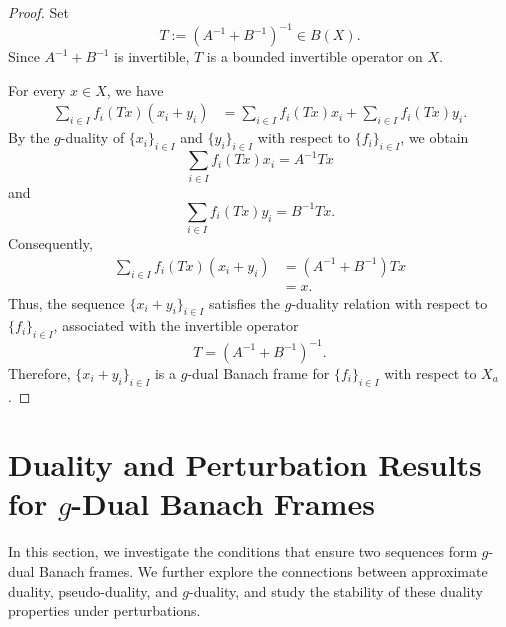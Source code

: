 \documentclass[12pt]{article}
\theoremstyle{definition}
\theoremstyle{remark}
\begin{document}
\begin{proof}
	Set
	\[
	T:=\left(A^{-1}+B^{-1}\right)^{-1}\in B(X).
	\]
	Since \(A^{-1}+B^{-1}\) is invertible, \(T\) is a bounded
	invertible operator on \(X\).
	
	For every \(x\in X\), we have
	\[
	\begin{aligned}
		\sum_{i\in I} f_i(Tx)(x_i+y_i)
		&=
		\sum_{i\in I} f_i(Tx)x_i
		+
		\sum_{i\in I} f_i(Tx)y_i.
	\end{aligned}
	\]
	By the \(g\)-duality of \(\{x_i\}_{i\in I}\) and
	\(\{y_i\}_{i\in I}\) with respect to \(\{f_i\}_{i\in I}\), we obtain
	\[
	\sum_{i\in I} f_i(Tx)x_i=A^{-1}Tx
	\]
	and
	\[
	\sum_{i\in I} f_i(Tx)y_i=B^{-1}Tx.
	\]
	Consequently,
	\[
	\begin{aligned}
		\sum_{i\in I} f_i(Tx)(x_i+y_i)
		&=(A^{-1}+B^{-1})Tx\\
		&=x.
	\end{aligned}
	\]
	Thus, the sequence \(\{x_i+y_i\}_{i\in I}\) satisfies the
	\(g\)-duality relation with respect to \(\{f_i\}_{i\in I}\),
	associated with the invertible operator
	\[
	T=\left(A^{-1}+B^{-1}\right)^{-1}.
	\]
	Therefore, \(\{x_i+y_i\}_{i\in I}\) is a \(g\)-dual Banach frame
	for \(\{f_i\}_{i\in I}\) with respect to \(X_a\).
\end{proof}


\section{Duality and Perturbation Results for \(g\)-Dual Banach Frames}

In this section, we investigate the conditions that ensure two sequences
form \(g\)-dual Banach frames. We further explore the connections between
approximate duality, pseudo-duality, and \(g\)-duality, and study the
stability of these duality properties under perturbations.
\end{document}
